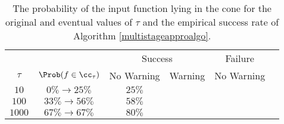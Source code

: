 \begin{table}[h]
\centering
\begin{tabular}{cccccc}
&&\multicolumn{2}{c}{Success} & Failure \\
$\tau$ &  $\Prob(f \in \cc_{\tau}) $ & No Warning & Warning & No Warning \\
\toprule
$10$ & $0\% \rightarrow  25\% $ & $25\%$  \\
$100$ & $33 \% \rightarrow 56\% $ & $58\%$ \\
$1000$ & $67\% \rightarrow 67\% $& $80\%$ \\
\end{tabular}
\caption{The probability of the input function lying in the cone for the original and eventual values of $\tau$ and the empirical success rate of Algorithm \ref{multistageapproalgo}.  \label{approxnumerical}}
\end{table}





